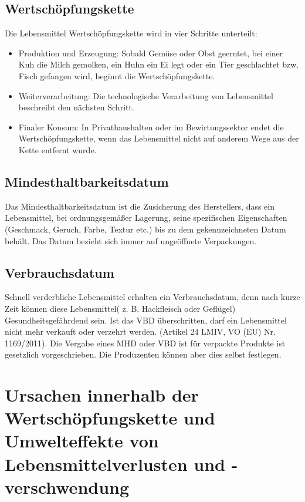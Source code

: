 \subsection{Wertschöpfungskette}
Die Lebensmittel Wertschöpfungskette wird in vier Schritte unterteilt:
\begin{itemize}
 \item Produktion und Erzeugung: Sobald Gemüse oder Obst geerntet, bei einer Kuh die Milch gemolken, ein Huhn ein Ei legt oder ein Tier geschlachtet bzw. Fisch gefangen wird, beginnt die Wertschöpfungskette. %
 \item Weiterverarbeitung: Die technologische Verarbeitung von Lebensmittel beschreibt den nächsten Schritt.
  \item Finaler Konsum: In Privathaushalten oder im Bewirtungssektor endet die Wertschöpfungskette, wenn das Lebensmittel nicht auf anderem Wege aus der Kette entfernt wurde. %

 
\end{itemize}

\subsection{Mindesthaltbarkeitsdatum}
Das Mindesthaltbarkeitsdatum ist die Zusicherung des Herstellers, dass ein Lebensmittel, bei ordnungsgemäßer Lagerung, seine spezifischen Eigenschaften (Geschmack, Geruch, Farbe, Textur etc.) bis zu dem gekennzeichneten Datum behält. Das Datum bezieht sich immer auf ungeöffnete Verpackungen. %


\subsection{Verbrauchsdatum}
Schnell verderbliche Lebensmittel erhalten ein Verbrauchsdatum, denn nach kurze Zeit können diese Lebensmittel( z. B. Hackfleisch oder Geflügel) Gesundheitsgefährdend sein. Ist das VBD überschritten, darf ein Lebensmittel nicht mehr verkauft oder verzehrt werden. (Artikel 24 LMIV, VO (EU) Nr. 1169/2011).
Die Vergabe eines MHD oder VBD ist für verpackte Produkte ist gesetzlich vorgeschrieben. Die Produzenten können aber dies selbst festlegen.%


\section{Ursachen innerhalb der Wertschöpfungskette und Umwelteffekte von Lebensmittelverlusten und
-verschwendung}


